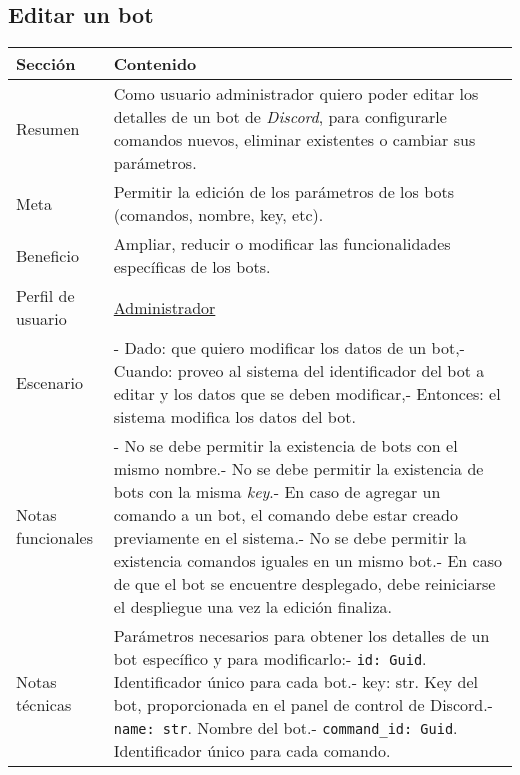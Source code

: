 \subsection{Editar un bot}

\begin{table}[H]
    \centering
    \def\arraystretch{1.25}
    \begin{adjustbox}{max width=\textwidth}
    \begin{tabularx}{\textwidth}{l|L}
    \hline
        \textbf{Sección} & \textbf{Contenido} \\ \hline
    \hline
        Resumen & Como usuario administrador quiero poder editar los detalles de un bot de \textit{Discord}, para configurarle comandos nuevos, eliminar existentes o cambiar sus parámetros. \\ \hline
        Meta & Permitir la edición de los parámetros de los bots (comandos, nombre, key, etc). \\ \hline
        Beneficio & Ampliar, reducir o modificar las funcionalidades específicas de los bots. \\ \hline
        Perfil de usuario & \hyperref[sec:personaAdmin]{Administrador} \\ \hline
        Escenario & - Dado: que quiero modificar los datos de un bot,\linebreak - Cuando: proveo al sistema del identificador del bot a editar y los datos que se deben modificar,\linebreak - Entonces: el sistema modifica los datos del bot. \\ \hline
        Notas funcionales & - No se debe permitir la existencia de bots con el mismo nombre.\linebreak - No se debe permitir la existencia de bots con la misma \textit{key}.\linebreak - En caso de agregar un comando a un bot, el comando debe estar creado previamente en el sistema.\linebreak - No se debe permitir la existencia comandos iguales en un mismo bot.\linebreak - En caso de que el bot se encuentre desplegado, debe reiniciarse el despliegue una vez la edición finaliza. \\ \hline
        Notas técnicas & Parámetros necesarios para obtener los detalles de un bot específico y para modificarlo:\linebreak - \verb|id: Guid|. Identificador único para cada bot.\linebreak - key: str. Key del bot, proporcionada en el panel de control de Discord.\linebreak - \verb|name: str|. Nombre del bot.\linebreak - \verb|command_id: Guid|. Identificador único para cada comando. \\ \hline

\end{tabularx}
\end{adjustbox}
\end{table}
